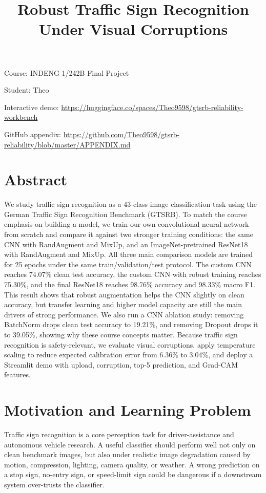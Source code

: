 \documentclass[12pt,letterpaper]{article}
\title{\vspace{-0.35in}\textbf{\fontsize{16}{20}\selectfont Robust Traffic Sign Recognition Under Visual Corruptions}}
\author{}
\date{}
\begin{document}
\maketitle
\vspace{-0.45in}

Course: INDENG 1/242B Final Project

Student: Theo

Interactive demo: \url{https://huggingface.co/spaces/Theo9598/gtsrb-reliability-workbench}

GitHub appendix: \url{https://github.com/Theo9598/gtsrb-reliability/blob/master/APPENDIX.md}

\section*{Abstract}
We study traffic sign recognition as a 43-class image classification task using the German Traffic Sign Recognition Benchmark (GTSRB). To match the course emphasis on building a model, we train our own convolutional neural network from scratch and compare it against two stronger training conditions: the same CNN with RandAugment and MixUp, and an ImageNet-pretrained ResNet18 with RandAugment and MixUp. All three main comparison models are trained for 25 epochs under the same train/validation/test protocol. The custom CNN reaches 74.07\% clean test accuracy, the custom CNN with robust training reaches 75.30\%, and the final ResNet18 reaches 98.76\% accuracy and 98.33\% macro F1. This result shows that robust augmentation helps the CNN slightly on clean accuracy, but transfer learning and higher model capacity are still the main drivers of strong performance. We also run a CNN ablation study: removing BatchNorm drops clean test accuracy to 19.21\%, and removing Dropout drops it to 39.05\%, showing why these course concepts matter. Because traffic sign recognition is safety-relevant, we evaluate visual corruptions, apply temperature scaling to reduce expected calibration error from 6.36\% to 3.04\%, and deploy a Streamlit demo with upload, corruption, top-5 prediction, and Grad-CAM features.

\section{Motivation and Learning Problem}
Traffic sign recognition is a core perception task for driver-assistance and autonomous vehicle research. A useful classifier should perform well not only on clean benchmark images, but also under realistic image degradation caused by motion, compression, lighting, camera quality, or weather. A wrong prediction on a stop sign, no-entry sign, or speed-limit sign could be dangerous if a downstream system over-trusts the classifier.
\end{document}
